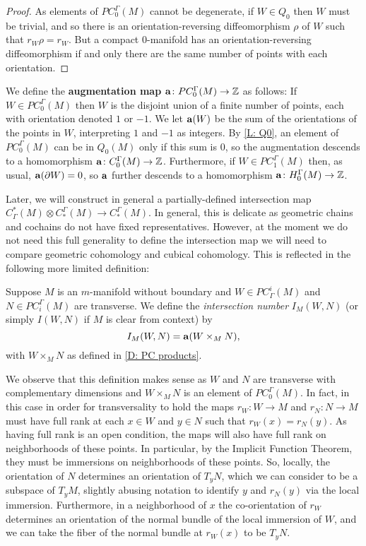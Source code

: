 \begin{proof}
	As elements of $PC_0^\Gamma(M)$ cannot be degenerate, if $W \in Q_0$ then $W$ must be trivial, and so there is an orientation-reversing diffeomorphism $\rho$ of $W$ such that $r_W\rho = r_W$.
	But a compact $0$-manifold has an orientation-reversing diffeomorphism if and only there are the same number of points with each orientation.
\end{proof}

\begin{definition}\label{D: aug}
	We define the \textbf{augmentation map} $\mathbf{a} \colon PC^\Gamma_0(M) \to \mathbb{Z}$ as follows: If $W \in PC^\Gamma_0(M)$ then $W$ is the disjoint union of a finite number of points, each with orientation denoted $1$ or $-1$.
	We let $\mathbf{a}(W)$ be the sum of the orientations of the points in $W$, interpreting $1$ and $-1$ as integers.
	By \cref{L: Q0}, an element of $PC^\Gamma_0(M)$ can be in $Q_0(M)$ only if this sum is $0$, so the augmentation descends to a homomorphism $\mathbf{a} \colon C^\Gamma_0(M) \to \mathbb{Z}$.
	Furthermore, if $W \in PC_1^\Gamma(M)$ then, as usual, $\mathbf{a}(\partial W) = 0$, so $\mathbf{a}$ further descends to a homomorphism $\mathbf{a} \colon H_0^\Gamma(M) \to \mathbb{Z}$.
\end{definition}

Later, we will construct in general a partially-defined intersection map $C^*_\Gamma(M) \otimes C_*^\Gamma(M) \to C_*^\Gamma(M)$.
In general, this is delicate as geometric chains and cochains do not have fixed representatives.
However, at the moment we do not need this full generality to define the intersection map we will need to compare geometric cohomology and cubical cohomology.
This is reflected in the following more limited definition:

\begin{definition}\label{D: intersection number}
	Suppose $M$ is an $m$-manifold without boundary and $W \in PC_\Gamma^i(M)$ and $N \in PC_{i}^\Gamma(M)$ are transverse.
	We define the \textit{intersection number} $I_M(W,N)$ (or simply $I(W,N)$ if $M$ is clear from context) by $$I_M(W,N) = \mathbf{a}(W \times_M N),$$ with $W \times_M N$ as defined in \cref{D: PC products}.
\end{definition}

We observe that this definition makes sense as $W$ and $N$ are transverse with complementary dimensions and $W \times_M N$ is an element of $PC_0^\Gamma(M)$.
In fact, in this case in order for transversality to hold the maps $r_W \colon W \to M$ and $r_N \colon N \to M$ must have full rank at each $x \in W$ and $y \in N$ such that $r_W(x) = r_N(y)$.
As having full rank is an open condition, the maps will also have full rank on neighborhoods of these points.
In particular, by the Implicit Function Theorem, they must be immersions on neighborhoods of these points.
So, locally, the orientation of $N$ determines an orientation of $T_yN$, which we can consider to be a subspace of $T_{y}M$, slightly abusing notation to identify $y$ and $r_N(y)$ via the local immersion.
Furthermore, in a neighborhood of $x$ the co-orientation of $r_W$ determines an orientation of the normal bundle of the local immersion of $W$, and we can take the fiber of the normal bundle at $r_W(x)$ to be $T_yN$.

